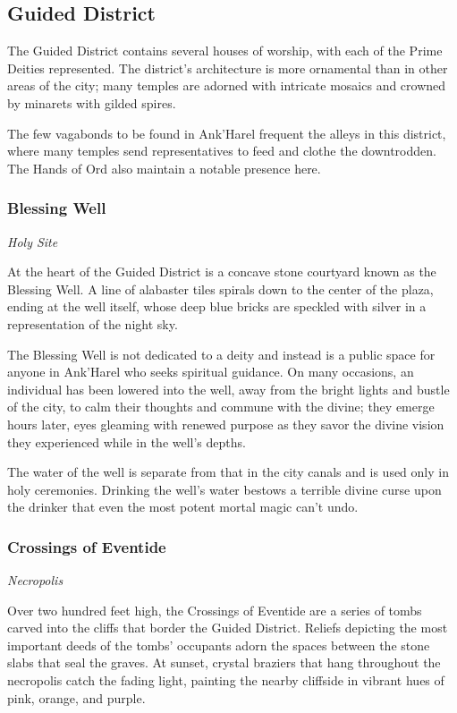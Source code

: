 \documentclass[a4paper, 11pt, bg=full, twocolumn, nooutline]{dndbook}
\begin{document}
\subsection{Guided District}

The Guided District contains several houses of worship, with each of the Prime Deities represented. The district's architecture is more ornamental than in other areas of the city; many temples are adorned with intricate mosaics and crowned by minarets with gilded spires.


The few vagabonds to be found in Ank'Harel frequent the alleys in this district, where many temples send representatives to feed and clothe the downtrodden. The Hands of Ord also maintain a notable presence here.

\subsubsection{Blessing Well}

\textit{Holy Site}

At the heart of the Guided District is a concave stone courtyard known as the Blessing Well. A line of alabaster tiles spirals down to the center of the plaza, ending at the well itself, whose deep blue bricks are speckled with silver in a representation of the night sky.

The Blessing Well is not dedicated to a deity and instead is a public space for anyone in Ank'Harel who seeks spiritual guidance. On many occasions, an individual has been lowered into the well, away from the bright lights and bustle of the city, to calm their thoughts and commune with the divine; they emerge hours later, eyes gleaming with renewed purpose as they savor the divine vision they experienced while in the well's depths.

The water of the well is separate from that in the city canals and is used only in holy ceremonies. Drinking the well's water bestows a terrible divine curse upon the drinker that even the most potent mortal magic can't undo.

\subsubsection{Crossings of Eventide}

\textit{Necropolis}

Over two hundred feet high, the Crossings of Eventide are a series of tombs carved into the cliffs that border the Guided District. Reliefs depicting the most important deeds of the tombs' occupants adorn the spaces between the stone slabs that seal the graves. At sunset, crystal braziers that hang throughout the necropolis catch the fading light, painting the nearby cliffside in vibrant hues of pink, orange, and purple.
\end{document}
